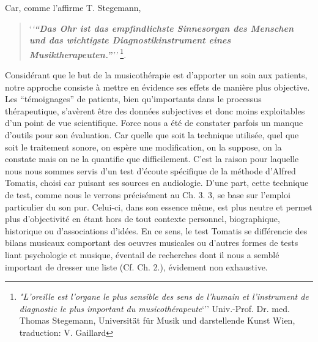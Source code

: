 Car, comme l'affirme T. Stegemann,

\begin{quotation}
	`\textit{`\textbf{``Das Ohr ist das empfindlichste
    Sinnesorgan des Menschen und das wichtigste Diagnostikinstrument
    eines Musiktherapeuten.''}''\autocite [p.44]{seminar_zuerich}}
\footnote{ \textit{"L'oreille est l'organe le plus sensible des sens de l'humain
et l'instrument de diagnostic  le plus important du
musicothérapeute}`''
Univ.-Prof. Dr. med. Thomas Stegemann, Universität für Musik und darstellende Kunst Wien, traduction: V. Gaillard}.
 \end{quotation}


Considérant que le but de la musicothérapie est d'apporter un soin aux patients,
notre  approche consiste à mettre en évidence ses effets de manière
plus objective. Les ``témoignages'' de patients, bien qu'importants dans le processus thérapeutique,
s'avèrent être des données subjectives et donc moins exploitables d'un
point de vue scientifique. Force nous a été de
constater parfois un manque d'outils pour son évaluation. Car quelle que soit la technique utilisée, quel que soit
le traitement sonore, on espère une modification, on la suppose, on la constate
 mais
 on ne la quantifie que difficilement.
  C'est la raison pour laquelle
 nous nous sommes servis d'un test d'écoute
 spécifique de la méthode d'Alfred Tomatis, choisi car puisant ses
 sources en audiologie. D'une part, cette technique de test, comme nous le verrons précisément au Ch. 3. 3, se base sur l'emploi particulier du son pur.
 Celui-ci, dans son essence même, est plus neutre et permet plus d'objectivité en étant hors de tout contexte personnel, biographique, historique ou d'associations d'idées. En ce sens, le test Tomatis se différencie des bilans musicaux comportant des oeuvres musicales ou d'autres formes de tests liant psychologie et musique, éventail de recherches dont il nous a semblé important de dresser une liste (Cf. Ch. 2.), évidement non exhaustive.


